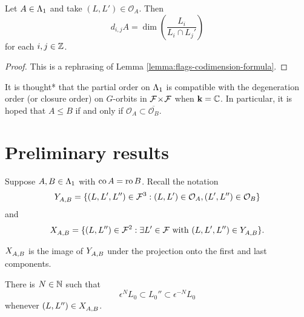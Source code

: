 \documentclass[a4paper, 11pt]{report}
\begin{document}
\begin{lemma}
Let $A\in{\Lambda_1}$ and take $(L,L')\in\mathcal{O}_A$. Then
\begin{equation*}
d_{i,j}A = \dim\left(\frac{L_i}{L_i\cap L_j'}\right)
\end{equation*}
for each $i,j\in\mathbb{Z}$.
\end{lemma}
\begin{proof}
This is a rephrasing of Lemma \ref{lemma:flags-codimension-formula}.
\end{proof}

\begin{remark}
It is thought* that the partial order on ${\Lambda_1}$ is compatible with the degeneration order (or closure order) on $G$-orbits in ${\mathcal{F}\!\times\!\mathcal{F}}$ when $\mathbf{k}=\mathbb{C}$. In particular, it is hoped that $A\le B$ if and only if $\mathcal{O}_A\subset \overline{\mathcal{O}_B}$.
\end{remark}

\section{Preliminary results}

Suppose $A,B\in{\Lambda_1}$ with $\operatorname{co}{A}=\operatorname{ro}{B}$. Recall the notation
\begin{equation*}
Y_{A,B}^{} = \{(L,L',L'')\in\mathcal{F}^3: (L,L')\in\mathcal{O}_A, (L',L'')\in\mathcal{O}_B\}
\end{equation*}
and
\begin{equation*}
X_{A,B}^{} = \{(L,L'')\in\mathcal{F}^2:\exists L'\in\mathcal{F} \text{ with } (L,L',L'')\in Y_{A,B}^{}\}.
\end{equation*}

$X_{A,B}^{}$ is the image of $Y_{A,B}^{}$ under the projection onto the first and last components.

\begin{lemma}\label{lemma:orbit-products-are-bounded}
There is $N\in\mathbb{N}$ such that
\begin{equation*}
\epsilon^N L_0\subset L_0''\subset \epsilon^{-N}L_0
\end{equation*}
whenever $(L,L'')\in X_{A,B}^{}$.
\end{lemma}
\end{document}
